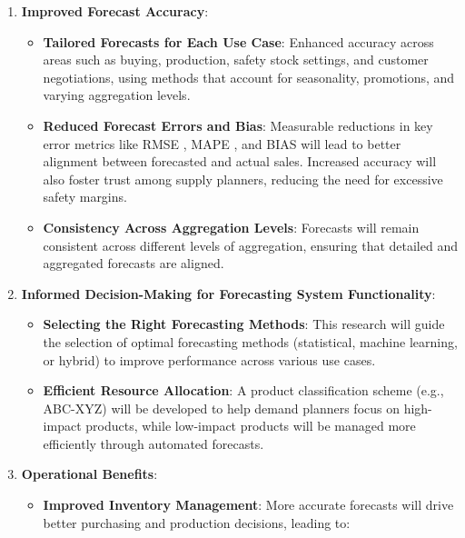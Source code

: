 \documentclass[
  american,
  10,
  a4paper,
]{book}
\providecommand{\tightlist}{%
  \setlength{\itemsep}{0pt}\setlength{\parskip}{0pt}}
\theoremstyle{definition}
\theoremstyle{remark}
\begin{document}
\begin{enumerate}
\def\labelenumi{\arabic{enumi}.}
\tightlist
\item
  \textbf{Improved Forecast Accuracy}:

  \begin{itemize}
  \tightlist
  \item
    \textbf{Tailored Forecasts for Each Use Case}: Enhanced accuracy
    across areas such as buying, production, safety stock settings, and
    customer negotiations, using methods that account for seasonality,
    promotions, and varying aggregation levels.
  \item
    \textbf{Reduced Forecast Errors and Bias}: Measurable reductions in
    key error metrics like RMSE , MAPE , and BIAS will lead to better
    alignment between forecasted and actual sales. Increased accuracy
    will also foster trust among supply planners, reducing the need for
    excessive safety margins.
  \item
    \textbf{Consistency Across Aggregation Levels}: Forecasts will
    remain consistent across different levels of aggregation, ensuring
    that detailed and aggregated forecasts are aligned.
  \end{itemize}
\item
  \textbf{Informed Decision-Making for Forecasting System
  Functionality}:

  \begin{itemize}
  \tightlist
  \item
    \textbf{Selecting the Right Forecasting Methods}: This research will
    guide the selection of optimal forecasting methods (statistical,
    machine learning, or hybrid) to improve performance across various
    use cases.
  \item
    \textbf{Efficient Resource Allocation}: A product classification
    scheme (e.g., ABC-XYZ) will be developed to help demand planners
    focus on high-impact products, while low-impact products will be
    managed more efficiently through automated forecasts.
  \end{itemize}
\item
  \textbf{Operational Benefits}:

  \begin{itemize}
  \tightlist
  \item
    \textbf{Improved Inventory Management}: More accurate forecasts will
    drive better purchasing and production decisions, leading to:


\end{itemize}
\end{enumerate}
\end{document}
